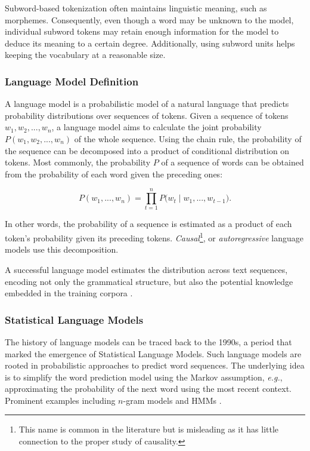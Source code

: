 Subword-based tokenization often maintains linguistic meaning, such as morphemes. Consequently, even though a word may be unknown to the model, individual subword tokens may retain enough information for the model to deduce its meaning to a certain degree. Additionally, using subword units helps keeping the vocabulary at a reasonable size.


\subsubsection{Language Model Definition}


A language model is a probabilistic model of a natural language that predicts probability distributions over sequences of tokens. Given a sequence of tokens $w_1, w_2, ..., w_n$, a language model aims to calculate the joint probability $P(w_1, w_2, ..., w_n)$ of the whole sequence. Using the chain rule, the probability of the sequence can be decomposed into a product of conditional distribution on tokens. Most commonly, the probability $P$ of a sequence of words can be obtained from the probability of each word given the preceding ones:

\begin{equation}
    P(w_1, ..., w_n) = \prod_{t=1}^{n} P\bigl(w_t \mid w_1, ..., w_{t-1}\bigr).
\label{equation:causal-distribution}
\end{equation}

In other words, the probability of a sequence is estimated as a product of each token's probability given its preceding tokens. \textit{Causal}\footnote{This name is common in the literature but is misleading as it has little connection to the proper study of causality.}, or \textit{autoregressive} language models use this decomposition.

A successful language model estimates the distribution across text sequences, encoding not only the grammatical structure, but also the potential knowledge embedded in the training corpora \citep{jozefowicz2016exploring}.

\subsubsection{Statistical Language Models} The history of language models can be traced back to the 1990s, a period that marked the emergence of Statistical Language Models. Such language models are rooted in probabilistic approaches to predict word sequences. The underlying idea is to simplify the word prediction model using the Markov assumption, \textit{e.g.}, approximating the probability of the next word using the most recent context. Prominent examples including $n$-gram models \citep{brown1992class, omar2018arabic} and \acp{HMM} \citep{petrushin2000hidden}.

